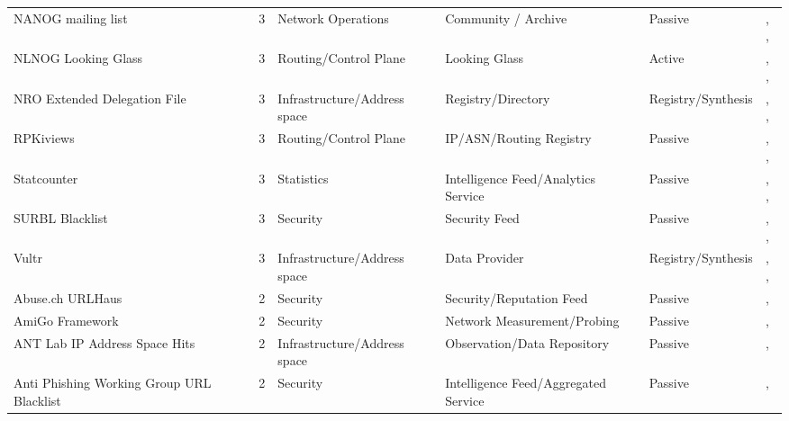 \begin{table}[h!]
\begin{tabular}{lllllll}
NANOG mailing list & \cite{nanogmailinglist} & 3 & Network Operations & Community / Archive & Passive & \cite{10.1145/3487552.3487838}, \cite{10.1007/978-3-032-18268-5_5}, \cite{10.1145/3777912.3839829} \\
NLNOG Looking Glass & \cite{nlnoglg} & 3 & Routing/Control Plane & Looking Glass & Active & \cite{10.1145/3618257.3624838}, \cite{10.1145/3646547.3689008}, \cite{10.1145/3777912.3809149} \\
NRO Extended Delegation File & \cite{nro_delegation_file} & 3 & Infrastructure/Address space & Registry/Directory & Registry/Synthesis & \cite{10.1007/978-3-031-56249-5_8}, \cite{10.1007/978-3-031-56252-5_11}, \cite{10.1007/978-3-032-18268-5_14} \\
RPKiviews & \cite{rpki-views} & 3 & Routing/Control Plane & IP/ASN/Routing Registry & Passive & \cite{10.1145/3730567.3764485}, \cite{10.1145/3730567.3764452}, \cite{10.1007/978-3-031-28486-1_18} \\
Statcounter & \cite{statcounter} & 3 & Statistics & Intelligence Feed/Analytics Service & Passive & \cite{10.1145/3618257.3624842}, \cite{10.1145/3777912.3839824}, \cite{10.1145/3777912.3839815} \\
SURBL Blacklist & \cite{surbl} & 3 & Security & Security Feed & Passive & \cite{10.1145/3487552.3487857}, \cite{10.1007/978-3-030-98785-5_2}, \cite{10.1007/978-3-031-56249-5_9} \\
Vultr & \cite{vultr} & 3 & Infrastructure/Address space & Data Provider & Registry/Synthesis & \cite{10.1145/3730567.3764495}, \cite{10.1007/978-3-031-85960-1_16}, \cite{10.1145/3777912.3809144} \\
Abuse.ch URLHaus & \cite{abusech-urlhaus} & 2 & Security & Security/Reputation Feed & Passive & \cite{10.1145/3487552.3487857}, \cite{10.1007/978-3-031-56249-5_9} \\
AmiGo Framework & \cite{amigo-framework} & 2 & Security & Network Measurement/Probing & Passive & \cite{10.1145/3730567.3764491}, \cite{10.1145/3517745.3561442} \\
ANT Lab IP Address Space Hits & \cite{ant_lab_hits} & 2 & Infrastructure/Address space & Observation/Data Repository & Passive & \cite{10.1007/978-3-030-98785-5_9}, \cite{10.1007/978-3-032-18268-5_3} \\
Anti Phishing Working Group URL Blacklist & \cite{apwg-blacklist} & 2 & Security & Intelligence Feed/Aggregated Service & Passive & \cite{10.1007/978-3-031-28486-1_24}, \cite{10.1007/978-3-031-56249-5_9} \\

\end{tabular}
\end{table}

